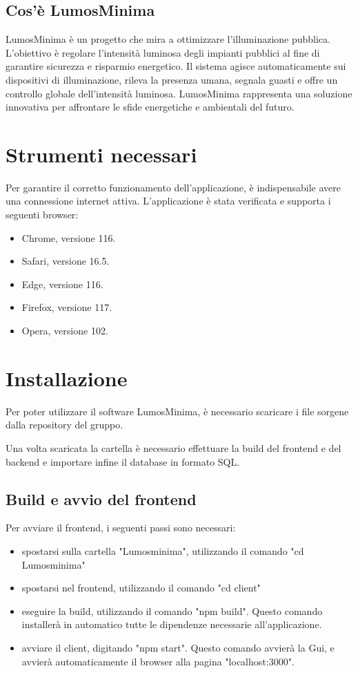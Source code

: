 \documentclass[9pt]{article}
\begin{document}
\subsection{Cos'è LumosMinima}
LumosMinima è un progetto che mira a ottimizzare l'illuminazione pubblica. L'obiettivo è regolare l'intensità luminosa degli impianti pubblici al fine di garantire sicurezza e risparmio energetico. Il sistema agisce automaticamente sui dispositivi di illuminazione, rileva la presenza umana, segnala guasti e offre un controllo globale dell'intensità luminosa. LumosMinima rappresenta una soluzione innovativa per affrontare le sfide energetiche e ambientali del futuro.

\section{Strumenti necessari}
Per garantire il corretto funzionamento dell'applicazione, è indispensabile avere una connessione internet attiva. L'applicazione è stata verificata e supporta i seguenti browser:

\begin{itemize}
	\item Chrome, versione 116.
	\item Safari, versione 16.5.
	\item Edge, versione 116.
	\item Firefox, versione 117.
	\item Opera, versione 102.
\end{itemize}
\clearpage
\section{Installazione}
Per poter utilizzare il software LumosMinima, è necessario scaricare i file sorgene dalla repository del gruppo.

Una volta scaricata la cartella è necessario effettuare la build del frontend e del backend e importare infine il database in formato SQL.

\subsection{Build e avvio del frontend}
Per avviare il frontend, i seguenti passi sono necessari:
\begin{itemize}
	\item spostarsi sulla cartella "Lumosminima", utilizzando il comando "cd Lumosminima"
	\item spostarsi nel frontend, utilizzando il comando "cd client"
	\item eseguire la build, utilizzando il comando "npm build". Questo comando installerà in automatico tutte le dipendenze necessarie all'applicazione.
	\item avviare il client, digitando "npm start". Questo comando avvierà la Gui, e avvierà automaticamente il browser alla pagina "localhost:3000".
\end{itemize}
\end{document}
